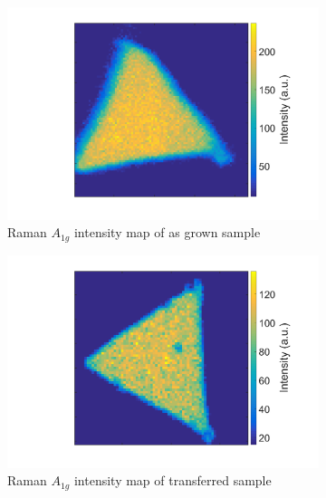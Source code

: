 \begin{figure}[H]
\begin{center}
\begin{subfigure}[b]{0.4\textwidth}
			\includegraphics[scale=0.15]{Transfer/TransferRamanIntensityAMapAsgrown.png}
			\caption{Raman $A_{1g}$ intensity map of as grown sample}
			\label{fig:TransferRamanIntensityAMapAsgrown}
		\end{subfigure}
		\quad
		\begin{subfigure}[b]{0.4\textwidth}
			\includegraphics[scale=0.15]{Transfer/TransferRamanIntensityAMapTransferred.png}
			\caption{Raman $A_{1g}$ intensity map of transferred sample}
			\label{fig:TransferRamanIntensityAMapTransferred}
		\end{subfigure}
		\vfill
		\begin{subfigure}[b]{0.4\textwidth}

\end{subfigure}
\end{center}
\end{figure}
